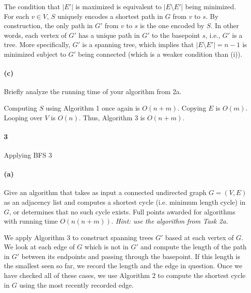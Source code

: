 \documentclass[12pt]{article}
\newlength{\myparskip}
\newenvironment{fullbox}{\begin{lrbox}{\savefullbox}\begin{minipage}{\dimexpr\textwidth-2\fboxsep\relax}\setlength{\parskip}{\myparskip}}{\end{minipage}\end{lrbox}\framebox[\textwidth]{\usebox{\savefullbox}}}
\newenvironment{pbox}[1][]{\begin{fullbox}\def\temp{#1}\ifx\temp\empty\else\paragraph{#1}\phantom{}\fi}{\end{fullbox}}
\theoremstyle{definition}
\newcommand{\<}{\langle}
\renewcommand{\>}{\rangle}
\begin{document}
The condition that $|E'|$ is maximized is equivalent to $|E \setminus E'|$ being minimized.
For each $v \in V$, $S$ uniquely encodes a shortest path in $G$ from $v$ to $s$.
By construction, the only path in $G'$ from $v$ to $s$ is the one encoded by $S$.
In other words, each vertex of $G'$ has a unique path in $G'$ to the basepoint $s$, i.e., $G'$ is a tree.
More specifically, $G'$ is a spanning tree, which implies that $|E \setminus E'| = n - 1$ is minimized subject to $G'$ being connected (which is a weaker condition than (i)).


\begin{pbox}[(c)]
    Briefly analyze the running time of your algorithm from 2a.
\end{pbox}

Computing $S$ using Algorithm 1 once again is $O(n + m)$.
Copying $E$ is $O(m)$.
Looping over $V$ is $O(n)$.
Thus, Algorithm 3 is $O(n + m)$.


\newpage
\begin{pbox}[3]
    Applying BFS 3
\end{pbox}

\begin{pbox}[(a)]
    Give an algorithm that takes as input a connected undirected graph $G = (V, E)$ as an adjacency list and computes a shortest cycle (i.e. minimum length cycle) in $G$, or determines that no such cycle exists. Full points awarded for algorithms with running time $O(n(n + m))$.
    \textit{Hint: use the algorithm from Task 2a.}
\end{pbox}

We apply Algorithm 3 to construct spanning trees $G'$ based at each vertex of $G$.
We look at each edge of $G$ which is not in $G'$ and compute the length of the path in $G'$ between its endpoints and passing through the basepoint.
If this length is the smallest seen so far, we record the length and the edge in question.
Once we have checked all of these cases, we use Algorithm 2 to compute the shortest cycle in $G$ using the most recently recorded edge.
\end{document}
